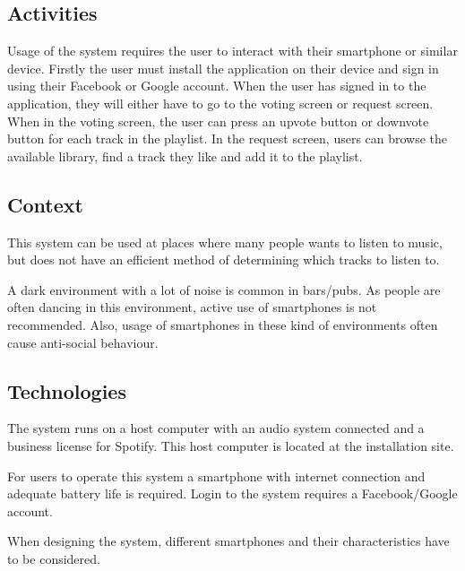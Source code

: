 \subsection{Activities}
\label{sub:pact_activities}

Usage of the system requires the user to interact with their smartphone or similar device. Firstly the user must install the application on their device and sign in using their Facebook or Google account. When the user has signed in to the application, they will either have to go to the voting screen or request screen. When in the voting screen, the user can press an upvote button or downvote button for each track in the playlist. In the request screen, users can browse the available library, find a track they like and add it to the playlist.

\subsection{Context}
\label{sub:pact_context}

This system can be used at places where many people wants to listen to music, but does not have an efficient method of determining which tracks to listen to.

A dark environment with a lot of noise is common in bars/pubs. As people are often dancing in this environment, active use of smartphones is not recommended. Also, usage of smartphones in these kind of environments often cause anti-social behaviour.

\subsection{Technologies}
\label{sub:pact_technologies}

The system runs on a host computer with an audio system connected and a business license for Spotify. This host computer is located at the installation site.

For users to operate this system a smartphone with internet connection and adequate battery life is required. Login to the system requires a Facebook/Google account.

When designing the system, different smartphones and their characteristics have to be considered.
